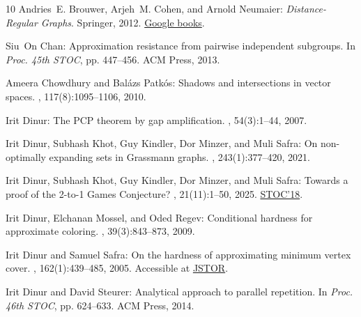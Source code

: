 \documentclass[11pt]{article}
\numberwithin{equation}{section}
\theoremstyle{definition}
\theoremstyle{plain}
\begin{document}
\begin{thebibliography}{10}
{\sc Andries~E. Brouwer, Arjeh~M. Cohen, and Arnold Neumaier}: {\em
  Distance-Regular Graphs}.
\newblock Springer, 2012.
\newblock \href{https://books.google.co.il/books?id=v6brCAAAQBAJ}{Google
  books}.
\newblock [\epfmtdoi{10.1007/978-3-642-74341-2}]

{\sc Siu~On Chan}: Approximation resistance from pairwise independent
  subgroups.
\newblock In {\em Proc. 45th STOC}, pp. 447--456. ACM Press, 2013.
\newblock [\epfmtdoi{10.1145/2488608.2488665}]

{\sc Ameera Chowdhury and Balázs Patkós}: Shadows and intersections in vector
  spaces.
, 117(8):1095--1106, 2010.

{\sc Irit Dinur}: The {PCP} theorem by gap amplification.
, 54(3):1--44, 2007.
\newblock [\epfmtdoi{10.1145/1236457.1236459}]

{\sc Irit Dinur, Subhash Khot, Guy Kindler, Dor Minzer, and Muli Safra}: On
  non-optimally expanding sets in {G}rassmann graphs.
, 243(1):377--420, 2021.
\newblock [\epfmtdoi{10.1007/s11856-021-2164-7}]

{\sc Irit Dinur, Subhash Khot, Guy Kindler, Dor Minzer, and Muli Safra}:
  Towards a proof of the 2-to-1 {G}ames {C}onjecture?
, 21(11):1--50, 2025.
\newblock \prelim \href{https://doi.org/10.1145/3188745.3188804}{STOC'18}.

{\sc Irit Dinur, Elchanan Mossel, and Oded Regev}: Conditional hardness for
  approximate coloring.
, 39(3):843--873, 2009.
\newblock [\epfmtdoi{10.1137/07068062X}]

{\sc Irit Dinur and Samuel Safra}: On the hardness of approximating minimum
  vertex cover.
, 162(1):439--485, 2005.
\newblock Accessible at \href{http://www.jstor.org/stable/3597377}{JSTOR}.

{\sc Irit Dinur and David Steurer}: Analytical approach to parallel repetition.
\newblock In {\em Proc. 46th STOC}, pp. 624--633. ACM Press, 2014.
\newblock [\epfmtdoi{10.1145/2591796.2591884}]


\end{thebibliography}
\end{document}
